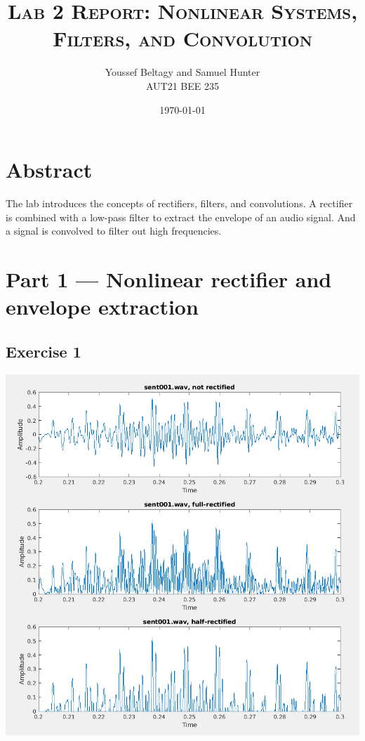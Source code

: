 \documentclass[11pt]{article}
\title{
    \textsc{Lab 2 Report: Nonlinear Systems, Filters, and Convolution}
}
\author{
    \Large{Youssef Beltagy and Samuel Hunter} \\
    \large \textsc{AUT21 BEE 235}
}
\date{\today}
\begin{document}
\maketitle %
\pagebreak


\section{Abstract}

The lab introduces the concepts of rectifiers, filters, and convolutions.
A rectifier is combined with a low-pass filter to extract the envelope of an audio signal.
And a signal is convolved to filter out high frequencies.

\section{Part 1 --- Nonlinear rectifier and envelope extraction}

\subsection{Exercise 1}



\includegraphics[width=\textwidth]{exercise1.png}
\end{document}
